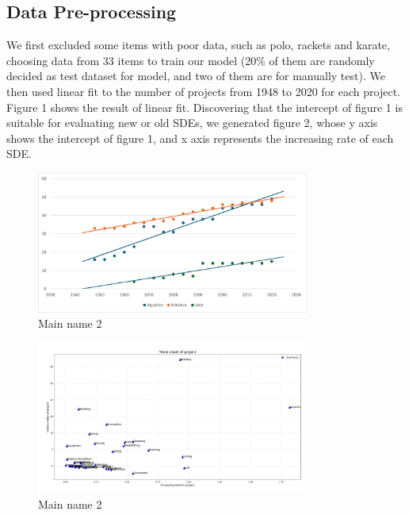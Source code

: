 \documentclass[a4paper]{article}
\begin{document}
\subsection{Data Pre-processing}
We first excluded some items with poor data, such as polo, rackets and karate, choosing data from 33 items to train our model (20\% of them are randomly decided as test dataset for model, and two of them are for manually test).
We then used linear fit to the number of projects from 1948 to 2020 for each project. Figure 1 shows the result of linear fit. 
Discovering that the intercept of figure 1 is suitable for evaluating new or old SDEs, we generated figure 2, whose y axis shows the intercept of figure 1,
and x axis represents the increasing rate of each SDE.
\captionsetup[listing]{labelformat=empty}
\begin{figure}[h] %
    \centering %
    \includegraphics[width=0.8\textwidth]{图片1.png} %
    \caption{Main name 2} %
    \label{Fig.main2} %
    \end{figure}
\begin{figure}[h] %
    \centering %
    \includegraphics[width=0.8\textwidth]{TrendChartOfProject} %
    \caption{Main name 2} %
    \label{Fig.main2} %
    \end{figure}
\end{document}
